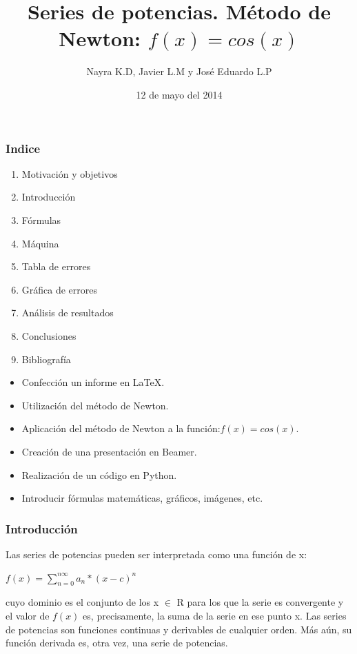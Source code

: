 \documentclass{beamer}
\title[Trabajo Final]{Series de potencias. Método de Newton: $f(x)=cos(x)$}
\author[Equipo $2_G$]{Nayra K.D, Javier L.M y José Eduardo L.P}
\institute{ULL.Facult.Matem}
\date[12/05/2014]{12 de mayo del 2014}
\begin{document}
\begin{frame}
\titlepage
\end{frame}

\begin{frame}
\frametitle{Indice}
\begin{enumerate}
\item Motivación y objetivos 
\item Introducción 
\item Fórmulas 
\item Máquina 
\item Tabla de errores 
\item Gráfica de errores 
\item Análisis de resultados 
\item Conclusiones 
\item Bibliografía 
\end{enumerate}
\end{frame}


\begin{frame}
\begin{itemize}
\frametitle{Motivación y Objetivos}
\item Confección un informe en \LaTeX{}.\pause
\item Utilización del método de Newton.\pause
\item Aplicación del método de Newton a la función:$f(x)=cos(x)$.\pause
\item Creación de una presentación en Beamer.\pause
\item Realización de un código en Python.\pause
\item Introducir fórmulas matemáticas, gráficos, imágenes, etc.
\end{itemize}
\end{frame}
%

\begin{frame}
\frametitle{Introducción}

Las series de potencias pueden ser interpretada como una función de x: \\

\centerline{ $ f(x) = \sum_{n=0}^{n\infty} a_n *(x-c)^n $}

cuyo dominio es el conjunto de los x $\in$ R para los que la serie es convergente y el valor de $ f(x) $ es, precisamente, la suma de la serie en ese punto x.
Las series de potencias son funciones continuas y derivables de cualquier orden. Más aún, su función derivada es, otra vez, una serie de potencias.
%


\end{frame}
\end{document}
